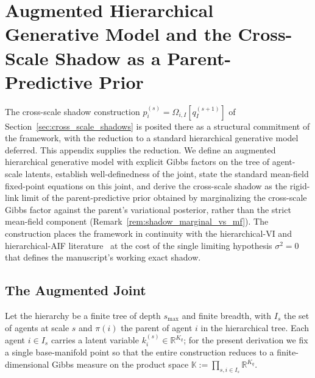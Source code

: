 \documentclass[11pt]{article}
\begin{document}
\section{Augmented Hierarchical Generative Model and the Cross-Scale Shadow as a Parent-Predictive Prior}
\label{app:augmented_joint}

The cross-scale shadow construction $p_i^{(s)} = \Omega_{i,I}[q_I^{(s+1)}]$ of Section~\ref{sec:cross_scale_shadows} is posited there as a structural commitment of the framework, with the reduction to a standard hierarchical generative model deferred. This appendix supplies the reduction. We define an augmented hierarchical generative model with explicit Gibbs factors on the tree of agent-scale latents, establish well-definedness of the joint, state the standard mean-field fixed-point equations on this joint, and derive the cross-scale shadow as the rigid-link limit of the parent-predictive prior obtained by marginalizing the cross-scale Gibbs factor against the parent's variational posterior, rather than the strict mean-field component (Remark~\ref{rem:shadow_marginal_vs_mf}). The construction places the framework in continuity with the hierarchical-VI and hierarchical-AIF literature~\cite{Friston2017, parr2022active} at the cost of the single limiting hypothesis $\sigma^2=0$ that defines the manuscript's working exact shadow.

\subsection{The Augmented Joint}

Let the hierarchy be a finite tree of depth $s_{\max}$ and finite breadth, with $I_s$ the set of agents at scale $s$ and $\pi(i)$ the parent of agent $i$ in the hierarchical tree. Each agent $i \in I_s$ carries a latent variable $k_i^{(s)} \in \mathbb{R}^{K_q}$; for the present derivation we fix a single base-manifold point so that the entire construction reduces to a finite-dimensional Gibbs measure on the product space $\mathbb{K} := \prod_{s, i \in I_s} \mathbb{R}^{K_q}$.
\end{document}
